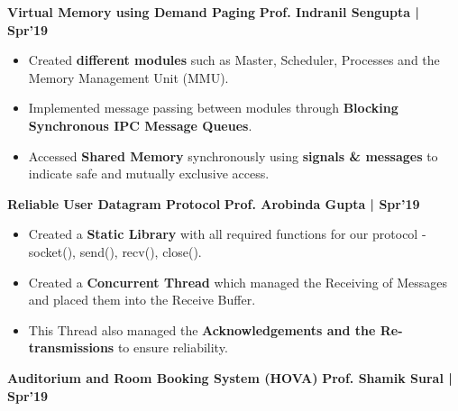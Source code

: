 \documentclass[10pt]{article}
\begin{document}
\spacedhrule{0.15ex}{1.0ex}
\large {\textbf{Virtual Memory using Demand Paging}} \normalsize  \href{https://github.com/shmundhra/Systems-Programming/tree/master/Demand_Paging} {\hspace{0.5ex}\faGithub} {\hfill} \textbf{Prof. Indranil Sengupta | Spr'19}\\[-1.75em]
\begin{itemize}
    \item Created \textbf{different modules} such as Master, Scheduler, Processes and the Memory Management Unit (MMU).\\[-1.9em]
    \item Implemented message passing between modules through     \textbf{Blocking Synchronous IPC Message Queues}.\\[-1.9em]
    \item Accessed \textbf{Shared Memory} synchronously using \textbf{signals \& messages} to indicate safe and mutually exclusive access.
    \\[-1em]
\end{itemize}
\vspace{-0.5ex}
\large {\textbf{Reliable User Datagram Protocol}} \normalsize  \href{https://github.com/shmundhra/Socket-Programming/tree/master/My\%20Reliable\%20UDP} {\hspace{0.5ex}\faGithub} {\hfill} \textbf{Prof. Arobinda Gupta | Spr'19}\\[-1.75em]
\begin{itemize}
    \item Created a \textbf{Static Library} with all required functions for our protocol - socket(), send(), recv(), close().\\[-1.9em]
    \item Created a \textbf{Concurrent Thread} which managed the Receiving of Messages and placed them into the Receive Buffer.\\[-1.9em]
    \item This Thread also managed the \textbf{Acknowledgements and the Re-transmissions} to ensure reliability.\\[-1em]
\end{itemize}
\vspace{-0.5ex}
\large {\textbf{Auditorium and Room Booking System (HOVA)}} \normalsize  \href{https://github.com/shmundhra/HOVA} {\hspace{0.5ex}\faGithub} {\hfill} \textbf{Prof. Shamik Sural | Spr'19}\\[-1.75em]
\end{document}
